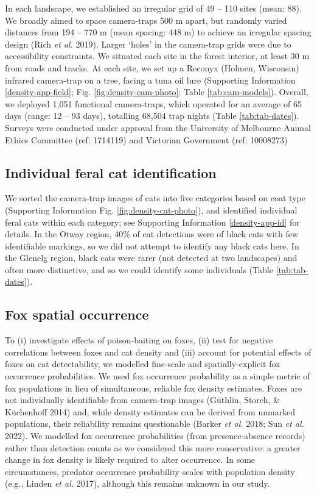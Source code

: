 \documentclass[preprint, 3p, authoryear]{elsarticle} %
\begin{document}
In each landscape, we established an irregular grid of 49 -- 110 sites (mean: 88). We broadly aimed to space camera-traps 500 m apart, but randomly varied distances from 194 -- 770 m (mean spacing: 448 m) to achieve an irregular spacing design (Rich \emph{et al.} 2019). Larger `holes' in the camera-trap grids were due to accessibility constraints. We situated each site in the forest interior, at least 30 m from roads and tracks. At each site, we set up a Reconyx (Holmen, Wisconsin) infrared camera-trap on a tree, facing a tuna oil lure (Supporting Information \ref{density-app-field}; Fig. \ref{fig:density-cam-photo}; Table \ref{tab:cam-models}). Overall, we deployed 1,051 functional camera-traps, which operated for an average of 65 days (range: 12 -- 93 days), totalling 68,504 trap nights (Table \ref{tab:tab-dates}). Surveys were conducted under approval from the University of Melbourne Animal Ethics Committee (ref: 1714119) and Victorian Government (ref: 10008273)

\hypertarget{individual-feral-cat-identification}{%
\subsection{Individual feral cat identification}\label{individual-feral-cat-identification}}

We sorted the camera-trap images of cats into five categories based on coat type (Supporting Information Fig. \ref{fig:density-cat-photo}), and identified individual feral cats within each category; see Supporting Information \ref{density-app-id} for details. In the Otway region, 40\% of cat detections were of black cats with few identifiable markings, so we did not attempt to identify any black cats here. In the Glenelg region, black cats were rarer (not detected at two landscapes) and often more distinctive, and so we could identify some individuals (Table \ref{tab:tab-dates}).

\hypertarget{density-methods-fox}{%
\subsection{Fox spatial occurrence}\label{density-methods-fox}}

To (i) investigate effects of poison-baiting on foxes, (ii) test for negative correlations between foxes and cat density and (iii) account for potential effects of foxes on cat detectability, we modelled fine-scale and spatially-explicit fox occurrence probabilities. We used fox occurrence probability as a simple metric of fox populations in lieu of simultaneous, reliable fox density estimates. Foxes are not individually identifiable from camera-trap images (Güthlin, Storch, \& Küchenhoff 2014) and, while density estimates can be derived from unmarked populations, their reliability remains questionable (Barker \emph{et al.} 2018; Sun \emph{et al.} 2022). We modelled fox occurrence probabilities (from presence-absence records) rather than detection counts as we considered this more conservative: a greater change in fox density is likely required to alter occurrence. In some circumstances, predator occurrence probability scales with population density (e.g., Linden \emph{et al.} 2017), although this remains unknown in our study.
\end{document}
